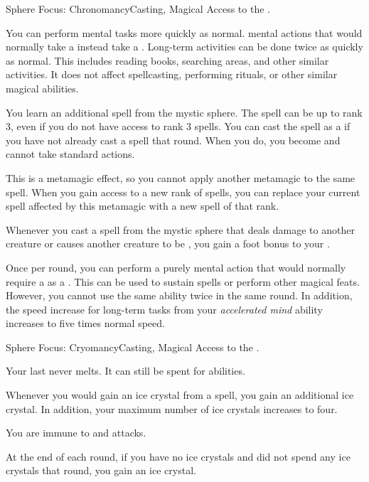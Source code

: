  \begin{magicalfeat}{Sphere Focus: Chronomancy}{Casting, Magical}
    \featpre Access to the  .

     You can perform mental tasks more quickly as normal.
     mental actions that would normally take a  instead take a .
    Long-term activities can be done twice as quickly as normal.
    This includes reading books, searching areas, and other similar activities.
    It does not affect spellcasting, performing rituals, or other similar magical abilities.

     You learn an additional spell from the  mystic sphere.
    The spell can be up to rank 3, even if you do not have access to rank 3 spells.
    You can cast the spell as a  if you have not already cast a spell that round.
    When you do, you  become \slowed and cannot take standard actions.

    This is a metamagic effect, so you cannot apply another metamagic to the same spell.
    When you gain access to a new rank of spells, you can replace your current spell affected by this metamagic with a new spell of that rank.

     Whenever you cast a spell from the  mystic sphere that deals damage to another creature or causes another creature to be \slowed, you  gain a  foot bonus to your .

     Once per round, you can perform a purely mental action that would normally require a  as a .
    This can be used to sustain spells or perform other magical feats.
    However, you cannot use the same ability twice in the same round.
    In addition, the speed increase for long-term tasks from your \textit{accelerated mind} ability increases to five times normal speed.
  \end{magicalfeat}

  \begin{magicalfeat}{Sphere Focus: Cryomancy}{Casting, Magical}
    \featpre Access to the  .

     Your last  never melts.
    It can still be spent for abilities.

     Whenever you would gain an ice crystal from a  spell, you gain an additional ice crystal.
    In addition, your maximum number of ice crystals increases to four.

     You are immune to \atCold and \atPoison attacks.

     At the end of each round, if you have no ice crystals and did not spend any ice crystals that round, you gain an ice crystal.
  \end{magicalfeat}

